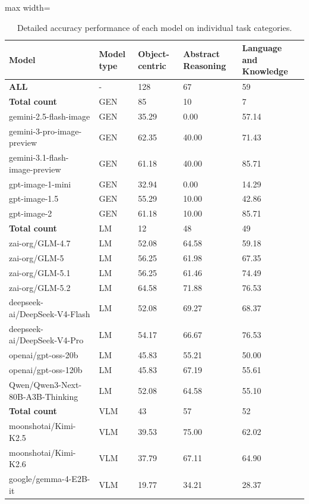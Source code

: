 \begin{table}[htbp!]
\centering
\caption{Detailed accuracy performance of each model on individual task categories.}
\label{tab:analyses_category-2}
\setlength{\tabcolsep}{3pt}
\begin{adjustbox}{max width=\textwidth}
\begin{tabular}{lllll}
\toprule
\textbf{Model} & \textbf{Model type} & \textbf{Object-centric} & \textbf{Abstract Reasoning} & \textbf{Language and Knowledge} \\
\midrule
\bf ALL & - &  128 & 67 & 59  \\
\midrule
\bf Total count & GEN &  85 & 10 & 7  \\
\hdashline
gemini-2.5-flash-image & GEN &  35.29 & 0.00 & 57.14 \\
gemini-3-pro-image-preview & GEN &  62.35 & 40.00 & 71.43\\
gemini-3.1-flash-image-preview & GEN & 61.18 & 40.00 & 85.71  \\
gpt-image-1-mini & GEN &  32.94 & 0.00 & 14.29  \\
gpt-image-1.5 & GEN &  55.29 & 10.00 & 42.86  \\
gpt-image-2 & GEN & 61.18 & 10.00 & 85.71  \\
\midrule
\bf Total count & LM & 12 & 48 & 49 \\
\hdashline
zai-org/GLM-4.7 & LM & 52.08 & 64.58 & 59.18  \\
zai-org/GLM-5 & LM &  56.25 & 61.98 & 67.35 \\
zai-org/GLM-5.1 & LM & 56.25 & 61.46 & 74.49 \\
zai-org/GLM-5.2 & LM & 64.58 & 71.88 & 76.53 \\
deepseek-ai/DeepSeek-V4-Flash & LM & 52.08 & 69.27 & 68.37  \\
deepseek-ai/DeepSeek-V4-Pro & LM &  54.17 & 66.67 & 76.53  \\
openai/gpt-oss-20b & LM & 45.83 & 55.21 & 50.00  \\
openai/gpt-oss-120b & LM & 45.83 & 67.19 & 55.61  \\
Qwen/Qwen3-Next-80B-A3B-Thinking & LM & 52.08 & 64.58 & 55.10  \\
\midrule
\bf Total count &VLM & 43 & 57 & 52 \\
\hdashline
moonshotai/Kimi-K2.5 & VLM  & 39.53 & 75.00 & 62.02  \\
moonshotai/Kimi-K2.6 & VLM & 37.79 & 67.11 & 64.90  \\
google/gemma-4-E2B-it & VLM & 19.77 & 34.21 & 28.37  \\

\end{tabular}
\end{adjustbox}
\end{table}
